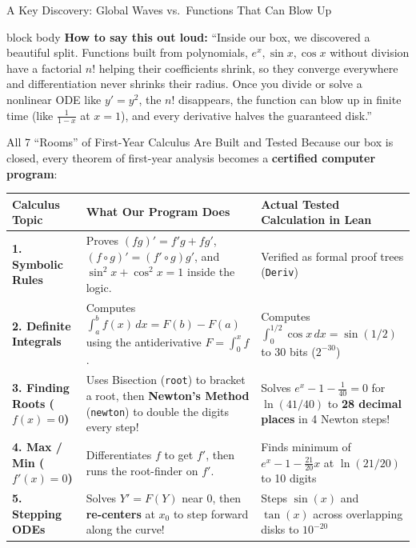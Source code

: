 \documentclass[aspectratio=169,11pt]{beamer}
\newcommand{\say}[1]{%
  \vfill
  \begin{beamercolorbox}[sep=5pt,rounded=true,shadow=false]{block body}
  {\footnotesize \textbf{\textcolor{deepblue}{How to say this out loud:}} ``#1''}
  \end{beamercolorbox}
}
\begin{document}
\begin{frame}[shrink=6]{A Key Discovery: Global Waves vs.\ Functions That Can Blow Up}
  \say{Inside our box, we discovered a beautiful split. Functions built from polynomials, $e^x, \sin x, \cos x$ without division have a factorial $n!$ helping their coefficients shrink, so they converge everywhere and differentiation never shrinks their radius. Once you divide or solve a nonlinear ODE like $y' = y^2$, the $n!$ disappears, the function can blow up in finite time (like $\frac{1}{1-x}$ at $x=1$), and every derivative halves the guaranteed disk.}
\end{frame}

\begin{frame}[shrink=12]{All 7 ``Rooms'' of First-Year Calculus Are Built and Tested}
  Because our box is closed, every theorem of first-year analysis becomes a \textbf{certified computer program}:
  \vspace{0.05cm}
  \footnotesize
  \begin{table}
    \centering
    \renewcommand{\arraystretch}{1.18}
    \begin{tabular}{>{\bfseries}p{2.9cm} p{5.2cm} p{5.0cm}}
      \toprule
      Calculus Topic & What Our Program Does & Actual Tested Calculation in Lean \\
      \midrule
      1. Symbolic Rules & Proves $(fg)' = f'g + fg'$, $(f\circ g)' = (f'\circ g)g'$, and $\sin^2 x + \cos^2 x = 1$ inside the logic. & Verified as formal proof trees (\texttt{Deriv}) \\
      2. Definite Integrals & Computes $\int_a^b f(x)\,dx = F(b) - F(a)$ using the antiderivative $F = \int_0^x f$. & Computes $\int_0^{1/2} \cos x\,dx = \sin(1/2)$ to 30 bits ($2^{-30}$) \\
      3. Finding Roots ($f(x)=0$) & Uses Bisection (\texttt{root}) to bracket a root, then \textbf{Newton's Method} (\texttt{newton}) to double the digits every step! & Solves $e^x - 1 - \frac{1}{40} = 0$ for $\ln(41/40)$ to \textbf{28 decimal places} in 4 Newton steps! \\
      4. Max / Min ($f'(x)=0$) & Differentiates $f$ to get $f'$, then runs the root-finder on $f'$. & Finds minimum of $e^x - 1 - \frac{21}{20}x$ at $\ln(21/20)$ to 10 digits \\
      5. Stepping ODEs & Solves $Y' = F(Y)$ near $0$, then \textbf{re-centers} at $x_0$ to step forward along the curve! & Steps $\sin(x)$ and $\tan(x)$ across overlapping disks to $10^{-20}$ \\

\end{tabular}
\end{table}
\end{frame}
\end{document}
